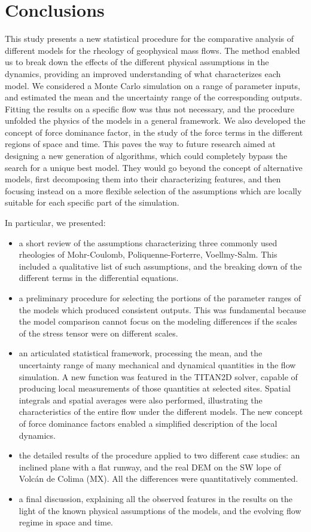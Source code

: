 \documentclass{article}
\begin{document}
\section{Conclusions}
This study presents a new statistical procedure for the comparative analysis of different models for the rheology of geophysical mass flows. The method enabled us to break down the effects of the different physical assumptions in the dynamics, providing an improved understanding of what characterizes each model. We considered a Monte Carlo simulation on a range of parameter inputs, and estimated the mean and the uncertainty range of the corresponding outputs. Fitting the results on a specific flow was thus not necessary, and the procedure unfolded the physics of the models in a general framework. We also developed the concept of force dominance factor, in the study of the force terms in the different regions of space and time. This paves the way to future research aimed at designing a new generation of algorithms, which could completely bypass the search for a unique best model. They would go beyond the concept of alternative models, first decomposing them into their characterizing features, and then focusing instead on a more flexible selection of the assumptions which are locally suitable for each specific part of the simulation.

In particular, we presented:
\begin{itemize}
  \item a short review of the assumptions characterizing three commonly used rheologies of Mohr-Coulomb, Poliquenne-Forterre, Voellmy-Salm. This included a qualitative list of such assumptions, and the breaking down of the different terms in the differential equations.
  \item a preliminary procedure for selecting the portions of the parameter ranges of the models which produced consistent outputs. This was fundamental because the model comparison cannot focus on the modeling differences if the scales of the stress tensor were on different scales.
  \item an articulated statistical framework, processing the mean, and the uncertainty range of many mechanical and dynamical quantities in the flow simulation. A new function was featured in the TITAN2D solver, capable of producing local measurements of those quantities at selected sites. Spatial integrals and spatial averages were also performed, illustrating the characteristics of the entire flow under the different models. The new concept of force dominance factors enabled a simplified description of the local dynamics.
  \item the detailed results of the procedure applied to two different case studies: an inclined plane with a flat runway, and the real DEM on the SW lope of Volc\'{a}n de Colima (MX). All the differences were quantitatively commented.
  \item a final discussion, explaining all the observed features in the results on the light of the known physical assumptions of the models, and the evolving flow regime in space and time.
\end{itemize}
\end{document}
